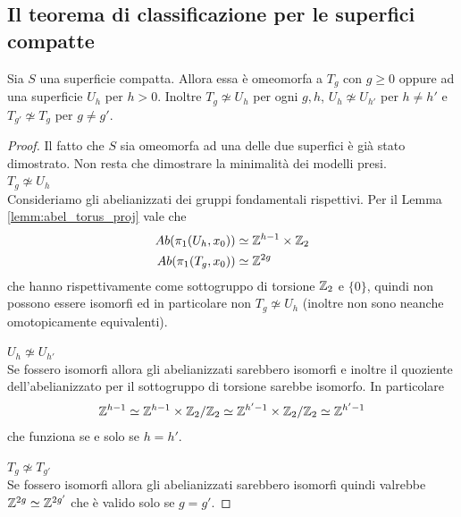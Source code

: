 \subsection{\textcolor{TopAlg}{\textbf{Il teorema di classificazione per le superfici compatte}}}
\begin{theorem}
	Sia $S$ una superficie compatta. Allora essa è omeomorfa a $T_g$ con $g\ge 0$ oppure ad una superficie $U_h$ per $h > 0$. Inoltre $T_g \not\simeq U_h$ per ogni $g,h$, $U_h \not\simeq U_{h'}$ per $h\neq h'$ e $T_{g'} \not\simeq T_g$ per $g \neq g'$.
\end{theorem}
\begin{proof}
	Il fatto che $S$ sia omeomorfa ad una delle due superfici è già stato dimostrato. Non resta che dimostrare la minimalità dei modelli presi.\\
	
	\textbf{$T_g \not\simeq U_h$}\\
	
	Consideriamo gli abelianizzati dei gruppi fondamentali rispettivi. Per il Lemma \ref{lemm:abel_torus_proj} vale che 
	\begin{equation}
	\begin{aligned}
		Ab(\pi_1(U_h, x_0)) & \simeq \mathbb{Z}^{h-1} \times \mathbb{Z}_2 \\
		Ab(\pi_1(T_g, x_0)) & \simeq \mathbb{Z}^{2g}
	\end{aligned}
	\end{equation}
	che hanno rispettivamente come sottogruppo di torsione $\mathbb{Z}_2$ e $\{0\}$, quindi non possono essere isomorfi ed in particolare non $T_g \not\simeq U_h$ (inoltre non sono neanche omotopicamente equivalenti).
	
	\textbf{$U_h \not\simeq U_{h'}$} \\
	
	Se fossero isomorfi allora gli abelianizzati sarebbero isomorfi e inoltre il quoziente dell'abelianizzato per il sottogruppo di torsione sarebbe isomorfo. In particolare 
	\begin{equation}
	\begin{aligned}
		\mathbb{Z}^{h-1} \simeq \mathbb{Z}^{h-1} \times \mathbb{Z}_2 / \mathbb{Z}_2 \simeq \mathbb{Z}^{h'-1} \times \mathbb{Z}_2 / \mathbb{Z}_2 \simeq \mathbb{Z}^{h'-1}
	\end{aligned}
	\end{equation}
	che funziona se e solo se $h = h'$.
	
	\textbf{$T_g \not\simeq T_{g'}$} \\
	
	Se fossero isomorfi allora gli abelianizzati sarebbero isomorfi quindi valrebbe $\mathbb{Z}^{2g} \simeq \mathbb{Z}^{2g'}$ che è valido solo se $g = g'$.
\end{proof}


